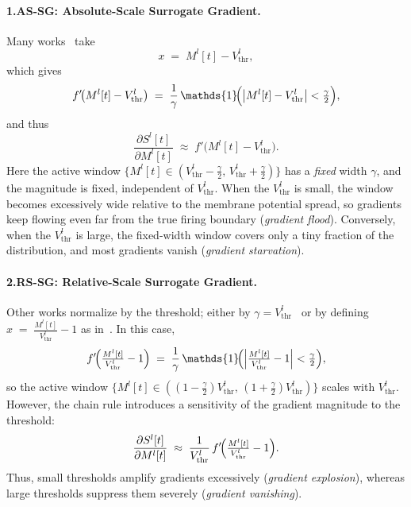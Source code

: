 \paragraph{1.\;AS-SG: Absolute-Scale Surrogate Gradient.}
Many works~\cite{zheng:2021, deng:2022, fang:2021, wang:2022} take
\begin{equation}
\label{eq:abs_diff_x}
x \;=\; M^l[t] - V^l_{\text{thr}},
\end{equation}
which gives
\begin{equation}
\label{eq:abs_diff_grad}
f'\!\bigl(M^l[t]-V^l_{\text{thr}}\bigr)
\;=\;
\frac{1}{\gamma}\,\mathds{1}\!\Bigl(\bigl|M^l[t]-V^l_{\text{thr}}\bigr|<\tfrac{\gamma}{2}\Bigr),
\end{equation}
and thus
\begin{equation}
\label{eq:abs_diff_sgrad}
\frac{\partial S^l[t]}{\partial M^l[t]}
\;\approx\;
f'\!\bigl(M^l[t]-V^l_{\text{thr}}\bigr).
\end{equation}
Here the active window \(\{M^l[t]\in(V^l_{\text{thr}}-\tfrac{\gamma}{2},\,V^l_{\text{thr}}+\tfrac{\gamma}{2})\}\) has a \emph{fixed} width \(\gamma\), and the magnitude is fixed, independent of \(V^l_{\text{thr}}\). When the \(V^l_{\text{thr}}\) is small, the window becomes excessively wide relative to the membrane potential spread, so gradients keep flowing even far from the true firing boundary (\emph{gradient flood}). Conversely, when the \(V^l_{\text{thr}}\) is large, the fixed-width window covers only a tiny fraction of the distribution, and most gradients vanish (\emph{gradient starvation}). 

\paragraph{2.\;RS-SG: Relative-Scale Surrogate Gradient.}
Other works normalize by the threshold; either by \(\gamma=V^l_{\text{thr}}\)~\cite{meng:2023} or by defining
\(
x \;=\; \frac{M^l[t]}{V^l_{\text{thr}}} - 1
\)
as in~\cite{rathi:2023}. In this case,
\begin{equation}
\label{eq:rel_diff_grad}
f'\!\Bigl(\tfrac{M^l[t]}{V^l_{\text{thr}}}-1\Bigr)
\;=\;
\frac{1}{\gamma}\,\mathds{1}\!\Bigl(\Bigl|\tfrac{M^l[t]}{V^l_{\text{thr}}}-1\Bigr|<\tfrac{\gamma}{2}\Bigr),
\end{equation}
so the active window \(\{M^l[t]\in((1-\tfrac{\gamma}{2})V^l_{\text{thr}},\,(1+\tfrac{\gamma}{2})V^l_{\text{thr}})\}\) scales with \(V^l_{\text{thr}}\). 
However, the chain rule introduces a sensitivity of the gradient magnitude to the threshold:
\begin{equation}
\label{eq:rel_diff_sgrad}
\frac{\partial S^l[t]}{\partial M^l[t]}
\;\approx\;
\frac{1}{V^l_{\text{thr}}}\,
f'\!\Bigl(\tfrac{M^l[t]}{V^l_{\text{thr}}}-1\Bigr).
\end{equation}
Thus, small thresholds amplify gradients excessively (\emph{gradient explosion}), whereas large thresholds suppress them severely (\emph{gradient vanishing}). 


